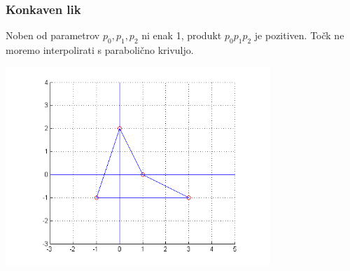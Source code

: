\documentclass{beamer}
\begin{document}

\begin{frame}

\frametitle{Konkaven lik}

Noben od parametrov $p_0, p_1, p_2$ ni enak 1,  produkt $p_0 p_1 p_2$ je pozitiven. Točk ne moremo interpolirati s parabolično krivuljo.

\includegraphics[width=10cm]{konk}

\end{frame}

\end{document}
